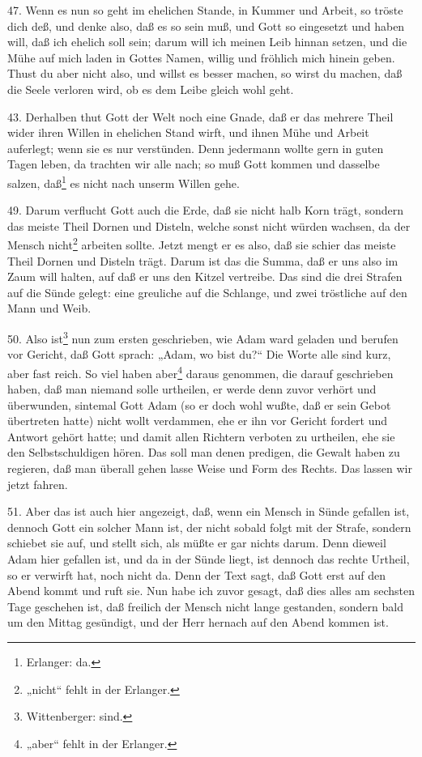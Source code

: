 47. Wenn es nun so geht im ehelichen Stande, in Kummer und Arbeit, so tröste dich deß, und denke also, daß es so sein muß, und
Gott so eingesetzt und haben will, daß ich ehelich soll sein; darum will ich meinen Leib hinnan setzen, und die Mühe auf mich laden in Gottes Namen, willig und fröhlich mich hinein geben. Thust du aber nicht also, und willst es besser machen, so wirst du machen, daß die Seele verloren wird, ob es dem Leibe gleich wohl geht.

43. Derhalben thut Gott der Welt noch eine Gnade, daß er das mehrere Theil wider ihren Willen in ehelichen Stand wirft, und ihnen Mühe und Arbeit auferlegt; wenn sie es nur verstünden. Denn jedermann wollte gern in guten Tagen leben, da trachten wir alle nach; so muß Gott kommen und dasselbe salzen, daß\footnote{Erlanger: da.} es nicht nach unserm Willen gehe.

49. Darum verflucht Gott auch die Erde, daß sie nicht halb Korn trägt, sondern das meiste Theil Dornen und Disteln, welche sonst nicht würden wachsen, da der Mensch nicht\footnote{„nicht“ fehlt in der Erlanger.} arbeiten sollte. Jetzt mengt er es also, daß sie schier das meiste Theil Dornen und Disteln trägt. Darum ist das die Summa, daß er uns also im Zaum will halten, auf daß er uns den Kitzel vertreibe. Das sind die drei Strafen auf die Sünde gelegt: eine greuliche auf die Schlange, und zwei tröstliche auf den Mann und Weib.

50. Also ist\footnote{Wittenberger: sind.} nun zum ersten geschrieben, wie Adam ward geladen und berufen vor Gericht, daß Gott sprach: „Adam, wo bist du?“ Die Worte alle sind kurz, aber fast reich. So viel haben aber\footnote{„aber“ fehlt in der Erlanger.} daraus genommen, die darauf geschrieben haben, daß man niemand solle urtheilen, er werde denn zuvor verhört und überwunden, sintemal Gott Adam (so er doch wohl wußte, daß er sein Gebot übertreten hatte) nicht wollt verdammen, ehe er ihn vor Gericht fordert und Antwort gehört hatte; und damit allen Richtern verboten zu urtheilen, ehe sie den Selbstschuldigen hören. Das soll man denen predigen, die Gewalt haben zu regieren, daß man überall gehen lasse Weise und Form des Rechts. Das lassen wir jetzt fahren.

51. Aber das ist auch hier angezeigt, daß, wenn ein Mensch in Sünde gefallen ist, dennoch Gott ein solcher Mann ist, der nicht sobald folgt mit der Strafe, sondern schiebet sie auf, und stellt sich, als müßte er gar nichts darum. Denn dieweil Adam hier gefallen ist, und da in der Sünde liegt, ist dennoch das rechte Urtheil, so er verwirft hat, noch nicht da. Denn der Text sagt, daß Gott erst auf den Abend kommt und ruft sie. Nun habe ich zuvor gesagt, daß dies alles am sechsten Tage geschehen ist, daß freilich der Mensch nicht lange gestanden, sondern bald um den Mittag gesündigt, und der Herr hernach auf den Abend kommen ist.

